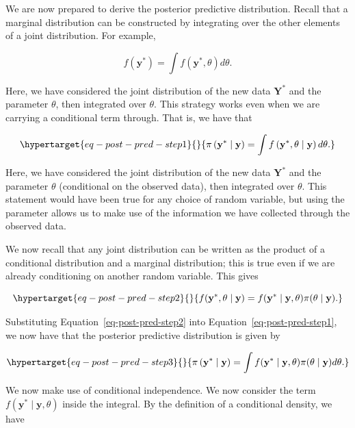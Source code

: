 \documentclass[
  letterpaper,
  DIV=11,
  numbers=noendperiod]{scrreprt}
\theoremstyle{definition}
\theoremstyle{plain}
\theoremstyle{definition}
\theoremstyle{remark}
\begin{document}
We are now prepared to derive the posterior predictive distribution.
Recall that a marginal distribution can be constructed by integrating
over the other elements of a joint distribution. For example,

\[f\left(\mathbf{y}^*\right) = \int f\left(\mathbf{y}^*, \theta\right) d\theta.\]

Here, we have considered the joint distribution of the new data
\(\mathbf{Y}^*\) and the parameter \(\theta\), then integrated over
\(\theta\). This strategy works even when we are carrying a conditional
term through. That is, we have that

\begin{equation}\protect\hypertarget{eq-post-pred-step1}{}{\pi\left(\mathbf{y}^* \mid \mathbf{y}\right) = \int f\left(\mathbf{y}^*, \theta \mid \mathbf{y}\right) d\theta.}\label{eq-post-pred-step1}\end{equation}

Here, we have considered the joint distribution of the new data
\(\mathbf{Y}^*\) and the parameter \(\theta\) (conditional on the
observed data), then integrated over \(\theta\). This statement would
have been true for any choice of random variable, but using the
parameter allows us to make use of the information we have collected
through the observed data.

We now recall that any joint distribution can be written as the product
of a conditional distribution and a marginal distribution; this is true
even if we are already conditioning on another random variable. This
gives

\begin{equation}\protect\hypertarget{eq-post-pred-step2}{}{f(\mathbf{y}^*, \theta \mid \mathbf{y}) = f(\mathbf{y}^* \mid \mathbf{y}, \theta) \pi(\theta \mid \mathbf{y}).}\label{eq-post-pred-step2}\end{equation}

Substituting Equation~\ref{eq-post-pred-step2} into
Equation~\ref{eq-post-pred-step1}, we now have that the posterior
predictive distribution is given by

\begin{equation}\protect\hypertarget{eq-post-pred-step3}{}{\pi\left(\mathbf{y}^* \mid \mathbf{y}\right) = \int f(\mathbf{y}^* \mid \mathbf{y}, \theta) \pi(\theta \mid \mathbf{y}) d\theta.}\label{eq-post-pred-step3}\end{equation}

We now make use of conditional independence. We now consider the term
\(f(\mathbf{y}^* \mid \mathbf{y}, \theta)\) inside the integral. By the
definition of a conditional density, we have
\end{document}
